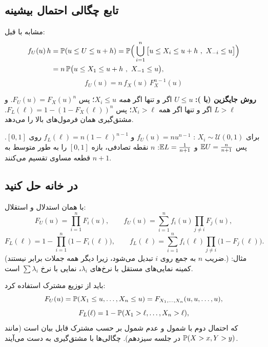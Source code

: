 \subsection{تابع چگالی احتمال بیشینه}
مشابه با قبل:
\[
\begin{aligned}
f_U(u)\,h&=\mathbb{P}(u\le U\le u+h)=\mathbb{P}\Big(\bigcup_{i=1}^{n}\big[u\le X_i\le u+h\ ,\ X_{-i}\le u\big]\Big)\\
&=n\,\mathbb{P}\big(u\le X_1\le u+h\ ,\ X_{-1}\le u\big),
\end{aligned}
\]
\[
\boxed{\ f_U(u)=n\,f_X(u)\,F_X^{n-1}(u)\ }
\]

\begin{note}
\notetitle \textbf{روش جایگزین (با ):} $U\le u$ اگر و تنها اگر \emph{همه} $X_i\le u$؛ پس $F_U(u)=F_X(u)^n$. و $L>\ell$ اگر و تنها اگر همه $X_i>\ell$؛ پس $F_L(\ell)=1-(1-F_X(\ell))^n$. مشتق‌گیری همان فرمول‌های بالا را می‌دهد.
\end{note}

\begin{example}
برای $X_i\sim\mathcal U(0,1)$ : $f_U(u)=nu^{n-1}$ و $f_L(\ell)=n(1-\ell)^{n-1}$ روی $[0,1]$. پس $\mathbb{E} U=\frac{n}{n+1}$ و $\mathbb{E} L=\frac{1}{n+1}$: $n$ نقطه تصادفی، بازه $[0,1]$ را به طور متوسط به $n+1$ قطعه مساوی تقسیم می‌کنند.
\end{example}

\subsection{در خانه حل کنید}

\begin{question}
\begin{answer}
با همان استدلال  و استقلال:
\[
F_U(u)=\prod_{i=1}^nF_i(u),\qquad f_U(u)=\sum_{i=1}^nf_i(u)\prod_{j\ne i}F_j(u),
\]
\[
F_L(\ell)=1-\prod_{i=1}^n\big(1-F_i(\ell)\big),\qquad f_L(\ell)=\sum_{i=1}^nf_i(\ell)\prod_{j\ne i}\big(1-F_j(\ell)\big).
\]
(ضریب $n$ به جمع روی $i$ تبدیل می‌شود، زیرا دیگر همه جملات برابر نیستند.) مثال: کمینه نمایی‌های مستقل با نرخ‌های $\lambda_i$، نمایی با نرخ $\sum\lambda_i$ است.
\end{answer}
\end{question}

\begin{question}
\begin{answer}
باید از توزیع مشترک استفاده کرد:
\[
F_U(u)=\mathbb{P}(X_1\le u,\ldots,X_n\le u)=F_{X_1,\ldots,X_n}(u,u,\ldots,u),
\]
\[
F_L(\ell)=1-\mathbb{P}(X_1>\ell,\ldots,X_n>\ell),
\]
که احتمال دوم با شمول و عدم شمول بر حسب  مشترک قابل بیان است (مانند $\mathbb{P}(X>x,Y>y)$ در جلسه سیزدهم). چگالی‌ها با مشتق‌گیری به دست می‌آیند.
\end{answer}
\end{question}

